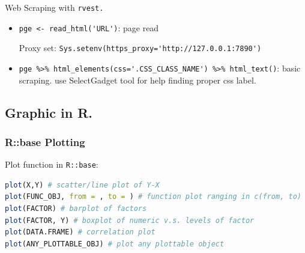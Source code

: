 \begin{point}
    Web Scraping with \lstinline|rvest.|
\end{point}

\begin{itemize}[topsep=2pt,itemsep=0pt]
    \item \lstinline|pge <- read_html('URL')|: page read
    
    Proxy set: \lstinline|Sys.setenv(https_proxy='http://127.0.0.1:7890')|
    \item \lstinline|pge %>% html_elements(css='.CSS_CLASS_NAME') %>% html_text()|: basic scraping. use SelectGadget tool for help finding proper css label.
\end{itemize}




\subsection{Graphic in R.}

\subsubsection{R::base Plotting}

    Plot function in \lstinline|R::base|:
\begin{lstlisting}[language=R]
plot(X,Y) # scatter/line plot of Y-X
plot(FUNC_OBJ, from = , to = ) # function plot ranging in c(from, to)
plot(FACTOR) # barplot of factors
plot(FACTOR, Y) # boxplot of numeric v.s. levels of factor
plot(DATA.FRAME) # correlation plot
plot(ANY_PLOTTABLE_OBJ) # plot any plottable object 
\end{lstlisting}

